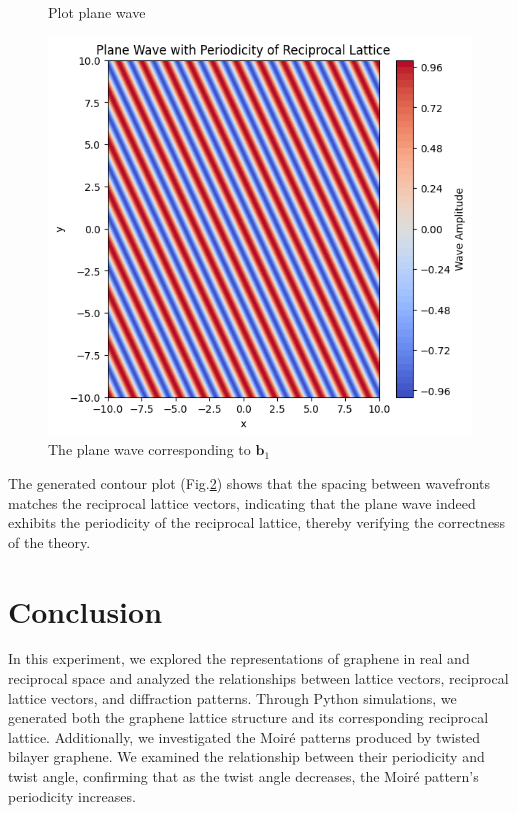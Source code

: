 \documentclass[12pt,a4paper]{article}
\begin{document}
\begin{CJK}{UTF8}{bkai}
\begin{enumerate}
\begin{itemize}
\begin{enumerate}
\begin{figure}[h]
                 \caption{Plot plane wave}
                 \label{fig:disc_2_3_5}
             \end{figure}
        \end{enumerate}
    \begin{figure}[h]
        \centering
        \includegraphics[width=0.7\linewidth]{figures/plane_wave.png}
        \caption{The plane wave corresponding to $\mathbf{b}_1$}
        \label{fig:plane_wave}
    \end{figure}
    The generated contour plot (Fig.\ref{fig:plane_wave}) shows that the spacing between wavefronts matches the reciprocal lattice vectors, indicating that the plane wave indeed exhibits the periodicity of the reciprocal lattice, thereby verifying the correctness of the theory.
    \end{itemize}
\end{enumerate}


\clearpage
\section{Conclusion}\label{sec:conclusion}
\hfill

In this experiment, we explored the representations of graphene in real and reciprocal space and analyzed the relationships between lattice vectors, reciprocal lattice vectors, and diffraction patterns. Through Python simulations, we generated both the graphene lattice structure and its corresponding reciprocal lattice. Additionally, we investigated the Moiré patterns produced by twisted bilayer graphene. We examined the relationship between their periodicity and twist angle, confirming that as the twist angle decreases, the Moiré pattern’s periodicity increases.


\end{CJK}
\end{document}
